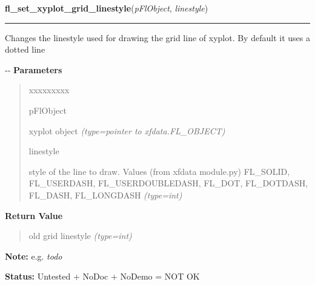 \hspace{.8\funcindent}\begin{boxedminipage}{\funcwidth}

    \raggedright \textbf{fl\_set\_xyplot\_grid\_linestyle}(\textit{pFlObject}, \textit{linestyle})

    \vspace{-1.5ex}

    \rule{\textwidth}{0.5\fboxrule}
\setlength{\parskip}{2ex}

Changes the linestyle used for drawing  the grid line of xyplot. By
default it uses a dotted line

-{}-
\setlength{\parskip}{1ex}
      \textbf{Parameters}
      \vspace{-1ex}

      \begin{quote}
        \begin{Ventry}{xxxxxxxxx}

          \item[pFlObject]


xyplot object
            {\it (type=pointer to xfdata.FL\_OBJECT)}

          \item[linestyle]


style of the line to draw. Values (from xfdata module.py) FL\_SOLID,
FL\_USERDASH, FL\_USERDOUBLEDASH, FL\_DOT, FL\_DOTDASH, FL\_DASH,
FL\_LONGDASH
            {\it (type=int)}

        \end{Ventry}

      \end{quote}

      \textbf{Return Value}
    \vspace{-1ex}

      \begin{quote}

old grid linestyle
      {\it (type=int)}

      \end{quote}

\textbf{Note:} 
e.g. \emph{todo}


\textbf{Status:} 
Untested + NoDoc + NoDemo = NOT OK


    \end{boxedminipage}

    \label{xformslib:flxyplot:fl_set_xyplot_alphaxtics}


